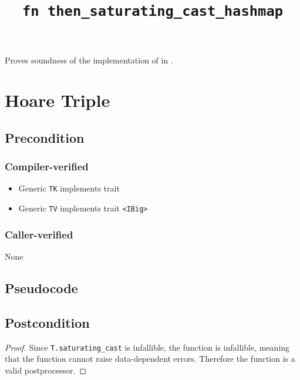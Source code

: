 \documentclass{article}
\title{\texttt{fn then\_saturating\_cast\_hashmap}}
\author{\MichaelShoemateAuthor}
\date{}
\begin{document}
\maketitle

\contrib
Proves soundness of the implementation of  in .

\section{Hoare Triple}
\subsection*{Precondition}
\subsubsection*{Compiler-verified}

\begin{itemize}
    \item Generic \texttt{TK} implements trait 
    \item Generic \texttt{TV} implements trait \texttt{<IBig>}
\end{itemize}

\subsubsection*{Caller-verified}
None

\subsection*{Pseudocode}


\subsection*{Postcondition}
\begin{theorem}
\end{theorem}

\begin{proof}
    Since \texttt{T.saturating\_cast} is infallible, the function is infallible,
    meaning that the function cannot raise data-dependent errors.
    Therefore the function is a valid postprocessor.
\end{proof}
\end{document}

